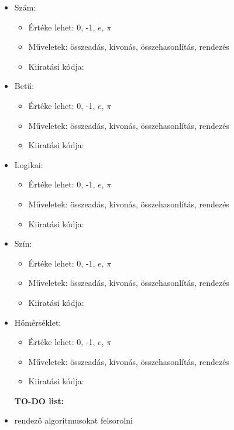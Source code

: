\documentclass[12pt, a4paper]{article}
\begin{document}
\begin{itemize}
	\item Szám:
	\begin{itemize}
		\item Értéke lehet: 0, -1, $e$, $\pi$
		\item Műveletek: összeadás, kivonás, összehasonlítás, rendezés
		\item Kiiratási kódja: %
	\end{itemize}
	\item Betű:
	\begin{itemize}
		\item Értéke lehet: 0, -1, $e$, $\pi$
		\item Műveletek: összeadás, kivonás, összehasonlítás, rendezés
		\item Kiiratási kódja: %
	\end{itemize}
	\item Logikai:
	\begin{itemize}
		\item Értéke lehet: 0, -1, $e$, $\pi$
		\item Műveletek: összeadás, kivonás, összehasonlítás, rendezés
		\item Kiiratási kódja: %
	\end{itemize}
	\item Szín:
	\begin{itemize}
		\item Értéke lehet: 0, -1, $e$, $\pi$
		\item Műveletek: összeadás, kivonás, összehasonlítás, rendezés
		\item Kiiratási kódja: %
	\end{itemize}
	\item Hőmérséklet:
	\begin{itemize}
		\item Értéke lehet: 0, -1, $e$, $\pi$
		\item Műveletek: összeadás, kivonás, összehasonlítás, rendezés
		\item Kiiratási kódja: %
	\end{itemize}
\end{itemize}


\begin{itemize}

    \item [\textbf{TO-DO list:}]
    \item rendező algoritmusokat felsorolni

\end{itemize}
\end{document}
